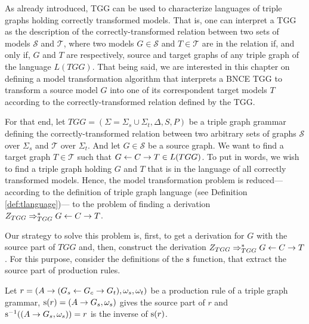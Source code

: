 As already introduced, TGG can be used to characterize languages of triple graphs holding correctly transformed models. That is, one can interpret a TGG as the description of the correctly-transformed relation between two sets of models $\mathcal{S}$ and $\mathcal{T}$, where two models $G \in \mathcal{S}$ and $T \in \mathcal{T}$ are in the relation if, and only if, $G$ and $T$ are respectively, source and target graphs of any triple graph of the language $L(TGG)$. That being said, we are interested in this chapter on defining a model transformation algorithm that interprets a BNCE TGG to transform a source model $G$ into one of its correspondent target models $T$ according to the correctly-transformed relation defined by the TGG.

For that end, let $TGG = (\Sigma = \Sigma_s \cup \Sigma_t, \Delta, S, P)$ be a triple graph grammar defining the correctly-transformed relation between two arbitrary sets of graphs $\mathcal{S}$ over $\Sigma_s$ and $\mathcal{T}$ over $\Sigma_t$. And let $G \in \mathcal{S}$ be a source graph. We want to find a target graph $T \in \mathcal{T}$ such that $G \overset{}{\leftarrow} C \overset{}{\rightarrow} T \in L(TGG)$. To put in words, we wish to find a triple graph holding $G$ and $T$ that is in the language of all correctly transformed models. Hence, the model transformation problem is reduced--- according to the definition of triple graph language (see Definition \ref{def:tlanguage})--- to the problem of finding a derivation $Z_{TGG} \Rightarrow^*_{TGG} G \overset{}{\leftarrow} C \overset{}{\rightarrow} T$.

Our strategy to solve this problem is, first, to get a derivation for $G$ with the source part of $TGG$ and, then, construct the derivation $Z_{TGG} \Rightarrow^*_{TGG} G \overset{}{\leftarrow} C \overset{}{\rightarrow} T$. For this purpose, consider the definitions of the $\operatorname{s}$ function, that extract the source part of production rules.


\begin{definition}
	\label{def:source}
	Let $r = (A \to (G_s \overset{}{\leftarrow} G_c \overset{}{\rightarrow} G_t), \omega_s, \omega_t)$ be a production rule of a triple graph grammar, $\operatorname{s}(r) = (A \to G_s,\omega_s)$ gives the source part of $r$ and $\operatorname{s}^{-1}((A \to G_s,\omega_s)) = r$ is the inverse of $\operatorname{s}(r)$.
\end{definition}

